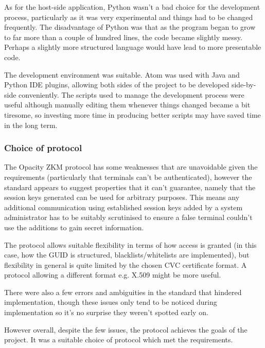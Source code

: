 \documentclass[12pt]{article}
\begin{document}
As for the host-side application, Python wasn't a bad choice for the development process, particularly as it was very experimental and things had to be changed frequently. The disadvantage of Python was that as the program began to grow to far more than a couple of hundred lines, the code became slightly messy. Perhaps a slightly more structured language would have lead to more presentable code.

The development environment was suitable. Atom was used with Java and Python IDE plugins, allowing both sides of the project to be developed side-by-side conveniently. The scripts used to manage the development process were useful although manually editing them whenever things changed became a bit tiresome, so investing more time in producing better scripts may have saved time in the long term.


\subsubsection{Choice of protocol}
The Opacity ZKM protocol has some weaknesses that are unavoidable given the requirements (particularly that terminals can't be authenticated), however the standard appears to suggest properties that it can't guarantee, namely that the session keys generated can be used for arbitrary purposes. This means any additional communication using established session keys added by a system administrator has to be suitably scrutinised to ensure a false terminal couldn't use the additions to gain secret information.

The protocol allows suitable flexibility in terms of how access is granted (in this case, how the GUID is structured, blacklists/whitelists are implemented), but flexibility in general is quite limited by the chosen CVC certificate format. A protocol allowing a different format e.g. X.509 might be more useful.

There were also a few errors and ambiguities in the standard that hindered implementation, though these issues only tend to be noticed during implementation so it's no surprise they weren't spotted early on.

However overall, despite the few issues, the protocol achieves the goals of the project. It was a suitable choice of protocol which met the requirements.
\end{document}
